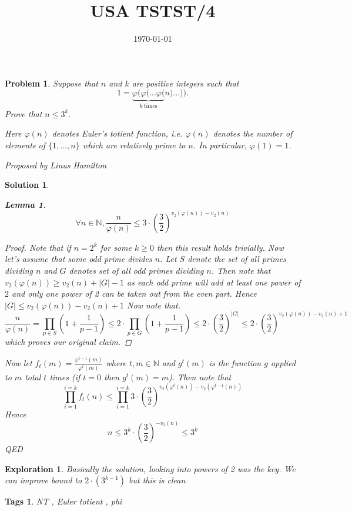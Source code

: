 \documentclass{article}
\title{USA TSTST/4}
\date{\today}
\newtheorem*{problem}{Problem}
\newtheorem*{solution}{Solution}
\newtheorem*{lemma}{Lemma}
\newtheorem*{exploration}{Exploration}
\newtheorem*{tags}{Tags}
\begin{document}
	
	\maketitle
	
	\begin{problem}
		Suppose that $n$ and $k$ are positive integers such that \[ 1 = \underbrace{\varphi( \varphi( \dots \varphi(}_{k\ \text{times}}n) \dots )). \] Prove that $n \le 3^k$.
		
		Here $\varphi(n)$ denotes Euler's totient function, i.e. $\varphi(n)$ denotes the number of elements of $\{1, \dots, n\}$ which are relatively prime to $n$. In particular, $\varphi(1) = 1$.
		
		Proposed by Linus Hamilton
	\end{problem}
	
	\begin{solution}
		\begin{lemma}
			\[
			\forall n \in \mathbb{N} , \frac{n}{\varphi(n)} \leq 3 \cdot \left( \frac{3}{2}\right)^{v_2(\varphi(n))-v_2(n)}
			\]
		\end{lemma}
		\begin{proof}
				Note that if $n=2^k$ for some $k\geq 0$ then this result holds trivially. Now let's assume that some odd prime divides $n$. Let $S$ denote the set of all primes dividing $n$ and $G$ denotes set of all odd primes dividing $n$.
				Then note that $v_2(\varphi(n)) \geq v_2(n) + |G|  -1$  as each odd prime will add at least one power of $2$ and only one power of 2 can be taken out from the even part.
				Hence $|G| \leq  v_2(\varphi(n))-v_2(n) +1 $
				Now note that. 
				\[
				 \frac{n}{\varphi(n)} = \prod_{p \in S}\left(1 + \frac{1}{p-1} \right) \leq 2\cdot \prod_{p \in G}\left(1 + \frac{1}{p-1} \right) \leq 2 \cdot \left(\frac{3}{2} \right)^{|G|} \leq 2 \cdot \left(\frac{3}{2} \right)^{v_2(\varphi(n))-v_2(n) +1 }
				 \]
				 which proves our original claim.
		\end{proof}
		Now let $f_t(m) = \frac{\varphi ^ {t-1} (m)}{\varphi ^ {t} (m)}$ where $t,m \in \mathbb{N}$ and $g^t(m) $ is the function $g$ applied to $m$ total $t$ times (if $t=0$ then $g^t(m)=m$). 
		Then note that 
		\[
		\prod_{i=1}^{i=k}  f_t(n) \leq \prod_{i=1}^{i=k} 3 \cdot   \left( \frac{3}{2}\right)^{v_2(\varphi^{t}(n))-v_2(\varphi^{t-1}(n))}
		\]
		Hence 
		\[
		n \leq 3^k \cdot   \left( \frac{3}{2}\right)^{-v_2(n)} \leq 3^k
		\]
		QED
	\end{solution}
	
	\begin{exploration}
		Basically the solution, looking into powers of 2 was the key. We can improve bound to $2 \cdot (3^{k-1})$ but this is clean
	\end{exploration}
	
	\begin{tags}
		NT , Euler totient , phi
	\end{tags}
	
\end{document}
